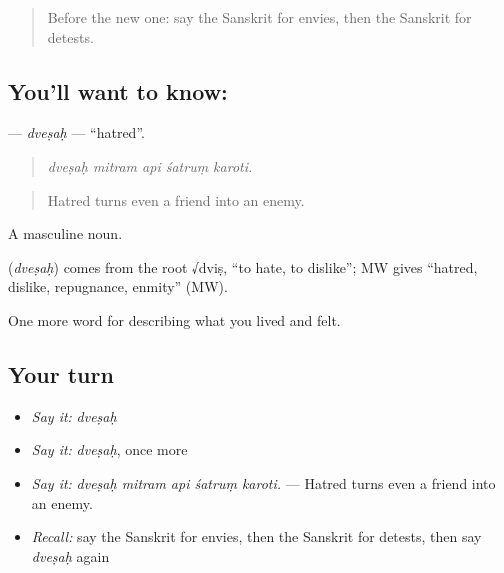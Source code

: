 \label{lesson:SA-C454-dvesah}



\begin{quote}
Before the new one: say the Sanskrit for envies, then the Sanskrit for detests.
\end{quote}

\subsection*{You'll want to know: }
\textbf{} — \emph{dveṣaḥ} — \textquotedblleft{}hatred\textquotedblright{}.

\begin{quote}
    
\end{quote}

\begin{quote}
\emph{dveṣaḥ mitram api śatruṃ karoti.}
\end{quote}

\begin{quote}
Hatred turns even a friend into an enemy.
\end{quote}

A masculine noun.

\begin{cousinweb}
\textbf{} (\emph{dveṣaḥ}) comes from the root √dviṣ, \textquotedblleft{}to hate, to dislike\textquotedblright{}; MW gives \textquotedblleft{}hatred, dislike, repugnance, enmity\textquotedblright{} (MW).
\end{cousinweb}

\begin{grammarlens}[title={What you've built}]
One more word for describing what you lived and felt.
\end{grammarlens}

\subsection*{Your turn}
\begin{itemize}
\raggedright
  \item \emph{Say it:} \emph{dveṣaḥ}
  \item \emph{Say it:} \emph{dveṣaḥ}, once more
  \item \emph{Say it:} \emph{dveṣaḥ mitram api śatruṃ karoti.} — Hatred turns even a friend into an enemy.
  \item \emph{Recall:} say the Sanskrit for envies, then the Sanskrit for detests, then say \emph{dveṣaḥ} again
\end{itemize}

